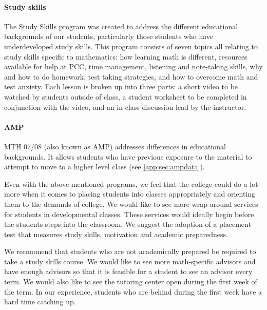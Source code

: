 \paragraph{ Study skills}
The Study Skills program was created to address the different educational backgrounds of our students, particularly those students who have underdeveloped study skills. This program consists of seven topics all relating to study skills specific to mathematics: how learning math is different, resources available for help at PCC, time management, listening and note-taking skills, why and how to do homework, test taking strategies, and how to overcome math and test anxiety.  Each lesson is broken up into three parts: a short video to be watched by students outside of class, a student worksheet to be completed in conjunction with the video, and an in-class discussion lead by the instructor. 

\paragraph{AMP}
MTH 07/08 (also known as AMP) addresses differences in educational backgrounds. It allows students who have previous exposure to the material to attempt to move to a higher level class (see \vref{app:sec:ampdata}).

Even with the above mentioned programs, we feel that the college could do a lot more when it comes to placing students into classes appropriately and orienting them to the demands of college. We would like to see more wrap-around services for students in developmental classes. These services would ideally begin before the students steps into the classroom. We suggest the adoption of a placement test that measures study skills, motivation and academic preparedness. 

We recommend that students who are not academically prepared be required to take a study skills course. We would like to see more math-specific advisors and have enough advisors so that it is feasible for a student to see an advisor every term.  We would also like to see the tutoring center open during the first week of the term. In our experience, students who are behind during the first week have a hard time catching up.

